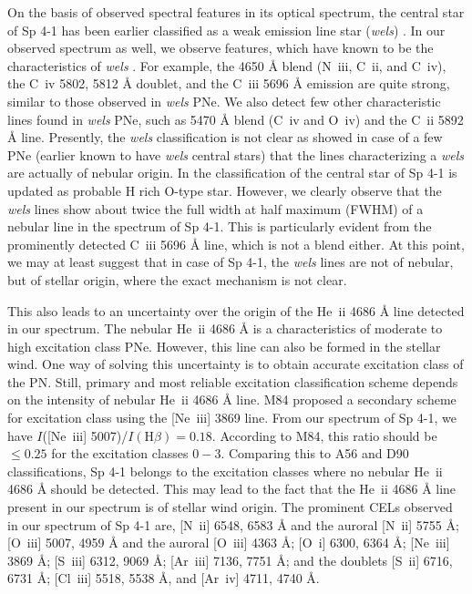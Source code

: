 \documentclass[a4paper,fleqn,usenatbib]{mnras}
\begin{document}
On the basis of observed spectral features in its optical spectrum, the central star of Sp 4-1 has been earlier classified as a weak emission line star (\textit{wels}) \citep{1993A&AS..102..595T,2011A&A...526A...6W}. In our observed spectrum as well, we observe features, which have known to be the characteristics of \textit{wels} \citep{2003AJ....126..887M}. For example, the 4650 {\AA} blend (N~{\sc iii}, C~{\sc ii}, and C~{\sc iv}), the C~{\sc iv} 5802, 5812 {\AA} doublet, and the C~{\sc iii} 5696 {\AA} emission are quite strong, similar to those observed in \textit{wels} PNe. We also detect few other characteristic lines found in \textit{wels} PNe, such as 5470 {\AA} blend (C~{\sc iv} and O~{\sc iv}) and the C~{\sc ii} 5892 {\AA} line. Presently, the \textit{wels} classification is not clear as \citet{2016MNRAS.458.2694B} showed in case of a few PNe (earlier known to have \textit{wels} central stars) that the lines characterizing a \textit{wels} are actually of nebular origin. In \citet{2018A&A...614A.135W} the classification of the central star of Sp 4-1 is updated as probable H rich O-type star. However, we clearly observe that the \textit{wels} lines show about twice the full width at half maximum (FWHM) of a nebular line in the spectrum of Sp 4-1. This is particularly evident from the prominently detected C~{\sc iii} 5696 {\AA} line, which is not a blend either. At this point, we may at least suggest that in case of Sp 4-1, the \textit{wels} lines are not of nebular, but of stellar origin, where the exact mechanism is not clear. 

This also leads to an uncertainty over the origin of the He~{\sc ii} 4686 {\AA} line detected in our spectrum. The nebular He~{\sc ii} 4686 {\AA} is a characteristics of moderate to high excitation class PNe. However, this line can also be formed in the stellar wind. One way of solving this uncertainty is to obtain accurate excitation class of the PN. Still, primary and most reliable excitation classification scheme depends on the intensity of nebular He~{\sc ii} 4686 {\AA} line. M84 proposed a secondary scheme for excitation class using the [Ne~{\sc iii}] 3869 line. From our spectrum of Sp 4-1, we have $I$([Ne~{\sc iii}] 5007)/$I(\mathrm{H}\beta)=0.18$. According to M84, this ratio should be $\leq0.25$ for the excitation classes $0-3$. Comparing this to A56 and D90 classifications, Sp 4-1 belongs to the excitation classes where no nebular He~{\sc ii} 4686 {\AA} should be detected. This may lead to the fact that the He~{\sc ii} 4686 {\AA} line present in our spectrum is of stellar wind origin. The prominent CELs observed in our spectrum of Sp 4-1 are, [N~{\sc ii}] 6548, 6583 {\AA} and the auroral [N~{\sc ii}] 5755 {\AA}; [O~{\sc iii}] 5007, 4959 {\AA} and the auroral [O~{\sc iii}] 4363 {\AA}; [O~{\sc i}] 6300, 6364 {\AA}; [Ne~{\sc iii}] 3869 {\AA}; [S~{\sc iii}] 6312, 9069 {\AA}; [Ar~{\sc iii}] 7136, 7751 {\AA}; and the doublets [S~{\sc ii}] 6716, 6731 {\AA}; [Cl~{\sc iii}] 5518, 5538 {\AA}, and [Ar~{\sc iv}] 4711, 4740 {\AA}.
\end{document}
